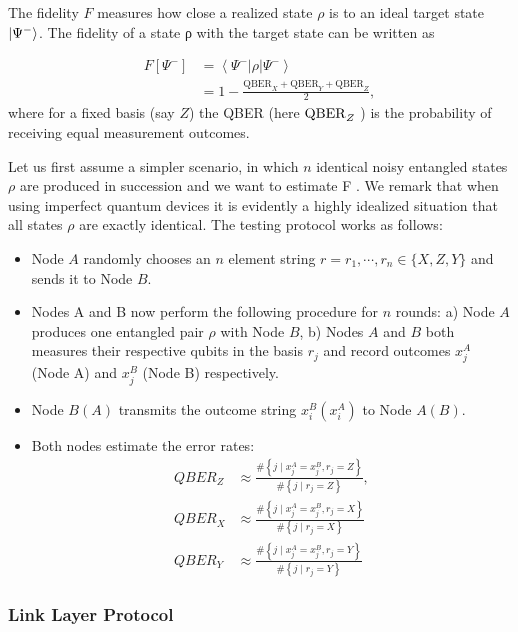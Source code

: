 \documentclass[10pt]{article}
\begin{document}
The fidelity $F$ measures how close a realized state $\rho$ is to an ideal target state $\ket{\Psi^{-}}$. The fidelity of a state ρ with the target
state can be written as

\begin{align}
F\left[\Psi^{-}\right]&=\left\langle\Psi^{-}|\rho| \Psi^{-}\right\rangle\\
&=1-\frac{\mathrm{QBER}_{X}+\mathrm{QBER}_{Y}+\mathrm{QBER}_{Z}}{2},
\end{align}
where for a fixed basis (say $Z$) the QBER (here ${\rm QBER}_Z$ ) is the probability of receiving equal measurement outcomes.

Let us first assume a simpler scenario, in which $n$ identical noisy entangled states $\rho$ are produced in succession and we want to estimate F . We remark that when using imperfect quantum devices it is evidently a highly idealized situation that all states $\rho$ are exactly identical. The testing protocol works as follows:

\begin{itemize}
    \item Node $A$ randomly chooses an $n$ element string $r = r_1,\cdots,r_n \in \{X,Z,Y \}$ and sends it to Node $B$.
    \item Nodes A and B now perform the following procedure for $n$ rounds: a) Node $A$ produces one entangled pair $\rho$ with Node $B$, b) Nodes $A$ and $B$ both measures their respective qubits in the basis $r_j$ and record outcomes $x_j^A$ (Node A) and $x_j^B$ (Node B) respectively.
    \item Node $B (A)$ transmits the outcome string $x_i^B(x_i^A)$ to Node $A (B)$.
    \item Both nodes estimate the error rates:
    \begin{align}
Q B E R_{Z} & \approx \frac{\#\left\{j \mid x_{j}^{A}=x_{j}^{B}, r_{j}=Z\right\}}{\#\left\{j \mid r_{j}=Z\right\}}, \\
Q B E R_{X} & \approx \frac{\#\left\{j \mid x_{j}^{A}=x_{j}^{B}, r_{j}=X\right\}}{\#\left\{j \mid r_{j}=X\right\}} \\
Q B E R_{Y} & \approx \frac{\#\left\{j \mid x_{j}^{A}=x_{j}^{B}, r_{j}=Y\right\}}{\#\left\{j \mid r_{j}=Y\right\}}
    \end{align}

\end{itemize}


\subsubsection{Link Layer Protocol}
\end{document}
